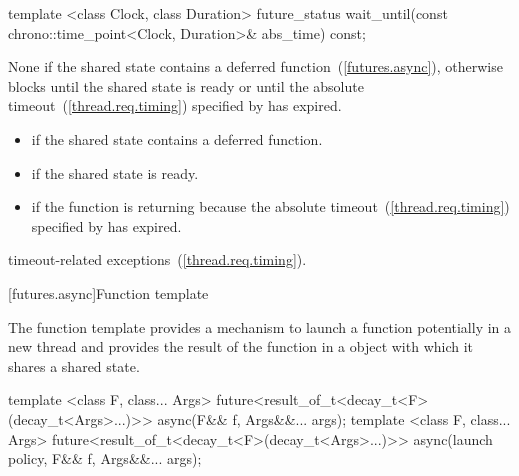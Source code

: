 %
%
\begin{itemdecl}
template <class Clock, class Duration>
  future_status wait_until(const chrono::time_point<Clock, Duration>& abs_time) const;
\end{itemdecl}

\begin{itemdescr}
\pnum
\effects
None if the shared state contains a deferred function~(\ref{futures.async}),
otherwise
blocks until the shared state is ready or until the
absolute timeout~(\ref{thread.req.timing}) specified by
 has expired.

\pnum
\returns

\begin{itemize}
\item {} if the shared state contains a deferred
function.

\item {} if the shared state is ready.

\item {} if the function is returning because the
absolute timeout~(\ref{thread.req.timing})
specified by  has expired.
\end{itemize}

\pnum
\throws
timeout-related exceptions~(\ref{thread.req.timing}).
\end{itemdescr}

[futures.async]{Function template }

\pnum
The function template  provides a mechanism to launch a function potentially
in a new thread and provides the result of the function in a  object with which
it shares a shared state.

%
\begin{itemdecl}
template <class F, class... Args>
  future<result_of_t<decay_t<F>(decay_t<Args>...)>> async(F&& f, Args&&... args);
template <class F, class... Args>
  future<result_of_t<decay_t<F>(decay_t<Args>...)>> async(launch policy, F&& f, Args&&... args);
\end{itemdecl}

